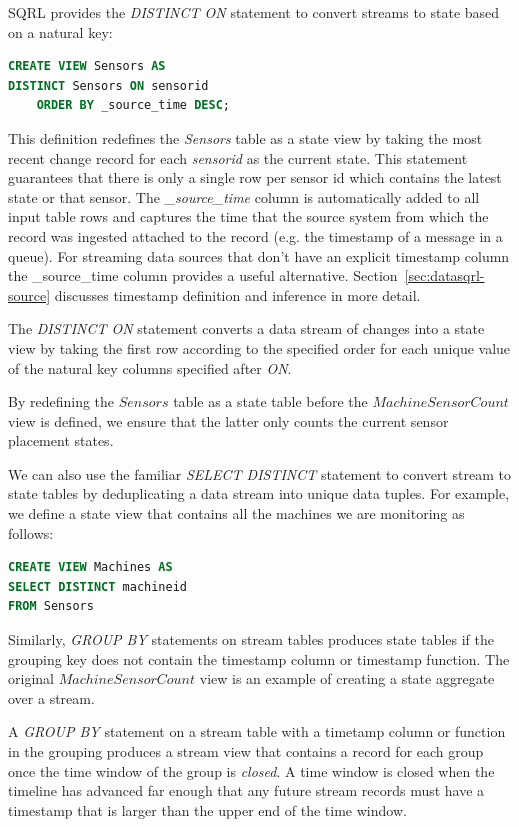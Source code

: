 \documentclass[	DIV=calc,%
							paper=letter,%
							fontsize=11pt,%
							twocolumn]{scrartcl}	 					%
\begin{document}
SQRL provides the \emph{DISTINCT ON} statement to convert streams to state based on a natural key:
\begin{lstlisting}[language=SQL]
CREATE VIEW Sensors AS
DISTINCT Sensors ON sensorid
    ORDER BY _source_time DESC;
\end{lstlisting}
This definition redefines the \emph{Sensors} table as a state view by taking the most recent change record for each \emph{sensorid} as the current state. This statement guarantees that there is only a single row per sensor id which contains the latest state or that sensor.
The \emph{\_source\_time} column is automatically added to all input table rows and captures the time that the source system from which the record was ingested attached to the record (e.g. the timestamp of a message in a queue). For streaming data sources that don't have an explicit timestamp column the \_source\_time column provides a useful alternative. Section~\ref{sec:datasqrl-source} discusses timestamp definition and inference in more detail.

The \emph{DISTINCT ON} statement converts a data stream of changes into a state view by taking the first row according to the specified order for each unique value of the natural key columns specified after \emph{ON}.

By redefining the $Sensors$ table as a state table before the $MachineSensorCount$ view is defined, we ensure that the latter only counts the current sensor placement states.

We can also use the familiar \emph{SELECT DISTINCT} statement to convert stream to state tables by deduplicating a data stream into unique data tuples. For example, we define a state view that contains all the machines we are monitoring as follows:
\begin{lstlisting}[language=SQL]
CREATE VIEW Machines AS
SELECT DISTINCT machineid
FROM Sensors
\end{lstlisting}

Similarly, \emph{GROUP BY} statements on stream tables produces state tables if the grouping key does not contain the timestamp column or timestamp function. The original $MachineSensorCount$ view is an example of creating a state aggregate over a stream.

A \emph{GROUP BY} statement on a stream table with a timetamp column or function in the grouping produces a stream view that contains a record for each group once the time window of the group is \emph{closed}. A time window is closed when the timeline has advanced far enough that any future stream records must have a timestamp that is larger than the upper end of the time window.
\end{document}
